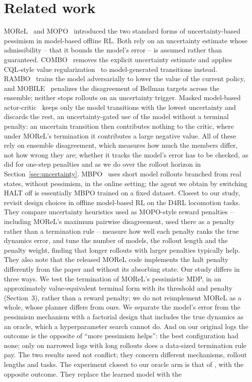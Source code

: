 \documentclass[11pt]{article}
\begin{document}
\section{Related work}

MOReL~\citep{kidambi2020morel} and MOPO~\citep{yu2020mopo} introduced the two standard forms of uncertainty-based pessimism in model-based offline RL. Both rely on an uncertainty estimate whose admissibility -- that it bounds the model's error -- is assumed rather than guaranteed. COMBO~\citep{yu2021combo} removes the explicit uncertainty estimate and applies CQL-style value regularization~\citep{kumar2020cql} to model-generated transitions instead. RAMBO~\citep{rigter2022rambo} trains the model adversarially to lower the value of the current policy, and MOBILE~\citep{sun2023mobile} penalizes the disagreement of Bellman targets across the ensemble; neither stops rollouts on an uncertainty trigger. Masked model-based actor-critic~\citep{pan2020m2ac} keeps only the model transitions with the lowest uncertainty and discards the rest, an uncertainty-gated use of the model without a terminal penalty: an uncertain transition then contributes nothing to the critic, where under MOReL's termination it contributes a large negative value. All of these rely on ensemble disagreement, which measures how much the members differ, not how wrong they are; whether it tracks the model's error has to be checked, as \citet{lu2022revisiting} did for one-step penalties and as we do over the rollout horizon in Section~\ref{sec:uncertainty}. MBPO~\citep{janner2019mbpo} uses short model rollouts branched from real states, without pessimism, in the online setting; the agent we obtain by switching HALT off is essentially MBPO trained on a fixed dataset. Closest to our study, \citet{lu2022revisiting} revisit design choices in offline model-based RL on the D4RL locomotion tasks. They compare uncertainty heuristics used as MOPO-style reward penalties -- including MOReL's maximum pairwise disagreement, used there as a penalty rather than a termination rule -- measure how well each penalty ranks the true dynamics error, and tune the number of models, the rollout length and the penalty weight, finding that longer rollouts with larger penalties typically help. They also note that the released MOReL code implements the halt penalty differently from the paper and without its absorbing state. Our study differs in three ways. We test the termination of MOReL's pessimistic MDP, in an approximately value-equivalent terminal form with its threshold and penalty (Section~3), rather than a reward penalty; we do not reimplement MOReL as a whole, whose planner differs from ours. We separate the model's error from the pessimism mechanism with a factorial design that includes the true dynamics as an oracle, which a hyperparameter search cannot do. And on our original logs the outcome is the opposite of ``more pessimism helps'': the best configuration had none; only on narrowed logs with long rollouts does a data-sized termination rule pay. The two results need not conflict; they concern different mechanisms, rollout lengths and tasks. The experiment closest to our oracle arm is that of \citet{sims2024edge}, with the opposite outcome. They replace the learned model with the 
\end{document}
